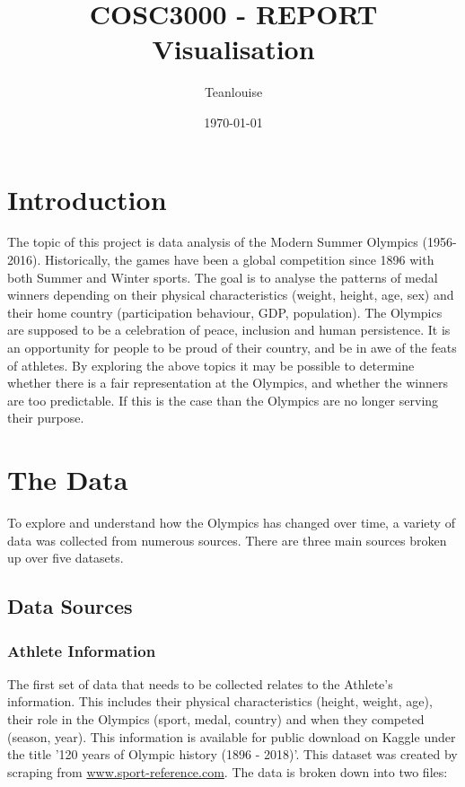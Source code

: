 \documentclass[a4 paper, 12pt]{article}
\title{COSC3000 - REPORT \\ Visualisation}
\author{Teanlouise}
\date{\today}
\begin{document}
\maketitle

\pagebreak
\tableofcontents

\pagebreak
\section{Introduction}
The topic of this project is data analysis of the Modern Summer Olympics (1956-2016). Historically, the games have been a global competition since 1896 with both Summer and Winter sports. The goal is to analyse the patterns of medal winners depending on their physical characteristics (weight, height, age, sex) and their home country (participation behaviour, GDP, population). The Olympics are supposed to be a celebration of peace, inclusion and human persistence. It is an opportunity for people to be proud of their country, and be in awe of the feats of athletes. By exploring the above topics it may be possible to determine whether there is a fair representation at the Olympics, and whether the winners are too predictable. If this is the case than the Olympics are no longer serving their purpose.

\section{The Data}
To explore and understand how the Olympics has changed over time, a variety of data was collected from numerous sources. There are three main sources broken up over five datasets. 

\subsection{Data Sources}

    \subsubsection{Athlete Information}
    The first set of data that needs to be collected relates to the Athlete's information. This includes their physical characteristics (height, weight, age), their role in the Olympics (sport, medal, country) and when they competed (season, year). This information is available for public download on Kaggle under the title '120 years of Olympic history (1896 - 2018)'. This dataset was created by scraping from \url{www.sport-reference.com}. The data is broken down into two files:
\end{document}
